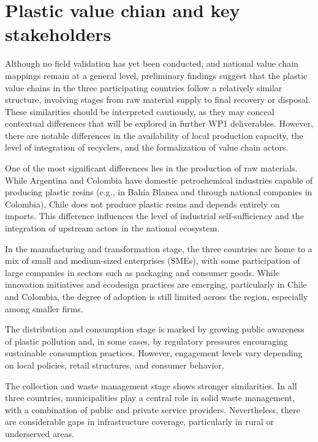 \documentclass[
  12pt,
  oneside]{book}
\begin{document}
\section{Plastic value chian and key
stakeholders}\label{plastic-value-chian-and-key-stakeholders}

Although no field validation has yet been conducted, and national value
chain mappings remain at a general level, preliminary findings suggest
that the plastic value chains in the three participating countries
follow a relatively similar structure, involving stages from raw
material supply to final recovery or disposal. These similarities should
be interpreted cautiously, as they may conceal contextual differences
that will be explored in further WP1 deliverables. However, there are
notable differences in the availability of local production capacity,
the level of integration of recyclers, and the formalization of value
chain actors.

One of the most significant differences lies in the production of raw
materials. While Argentina and Colombia have domestic petrochemical
industries capable of producing plastic resins (e.g., in Bahía Blanca
and through national companies in Colombia), Chile does not produce
plastic resins and depends entirely on imports. This difference
influences the level of industrial self-sufficiency and the integration
of upstream actors in the national ecosystem.

In the manufacturing and transformation stage, the three countries are
home to a mix of small and medium-sized enterprises (SMEs), with some
participation of large companies in sectors such as packaging and
consumer goods. While innovation initiatives and ecodesign practices are
emerging, particularly in Chile and Colombia, the degree of adoption is
still limited across the region, especially among smaller firms.

The distribution and consumption stage is marked by growing public
awareness of plastic pollution and, in some cases, by regulatory
pressures encouraging sustainable consumption practices. However,
engagement levels vary depending on local policies, retail structures,
and consumer behavior.

The collection and waste management stage shows stronger similarities.
In all three countries, municipalities play a central role in solid
waste management, with a combination of public and private service
providers. Nevertheless, there are considerable gaps in infrastructure
coverage, particularly in rural or underserved areas.
\end{document}
